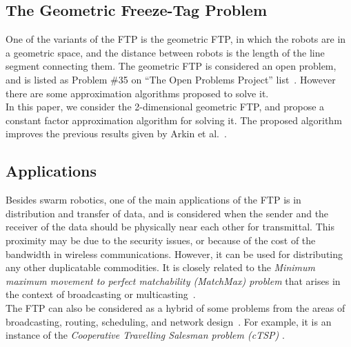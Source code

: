 \documentclass[review]{elsarticle}
\begin{document}
\subsection{The Geometric Freeze-Tag Problem}
One of the variants of the FTP is the geometric FTP, in which the robots are in a geometric space, and the distance between robots is the length of the line segment connecting them. The geometric FTP is considered an open problem, and is listed as Problem \#35 on ``The Open Problems Project'' list~\cite{OpenProblems}. However there are some approximation algorithms proposed to solve it.\\
In this paper, we consider the 2-dimensional geometric FTP, and propose a constant factor approximation algorithm for solving it. The proposed algorithm improves the previous results given by Arkin et al.~\cite{Arkin2006}.

\subsection{Applications}
Besides swarm robotics, one of the main applications of the FTP is in distribution and transfer of data, and is considered when the sender and the receiver of the data should be physically near each other for transmittal. This proximity may be due to the security issues, or because of the cost of the bandwidth in wireless communications. However, it can be used for distributing any other duplicatable commodities.
It is closely related to the \textit{Minimum maximum movement to perfect matchability (MatchMax) problem} that arises in the context of broadcasting or multicasting~\cite{Demaine2009}.\\
The FTP can also be considered as a hybrid of some problems from the areas of broadcasting, routing, scheduling, and network design~\cite{Arkin2006}. For example, it is an instance of the \textit{Cooperative Travelling Salesman problem (cTSP)} \cite{Armon2010}.
\end{document}

